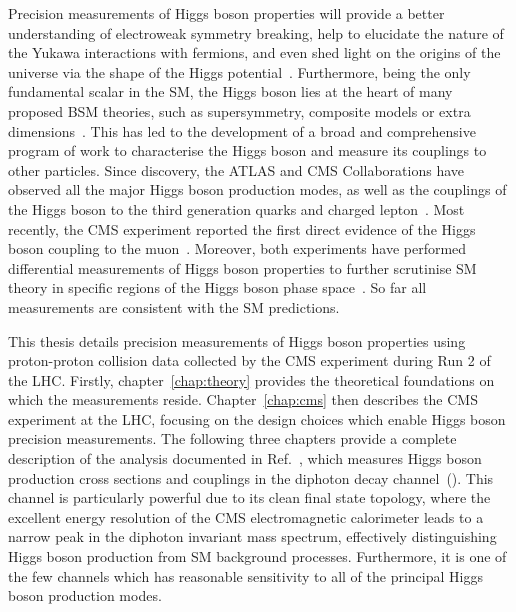 Precision measurements of Higgs boson properties will provide a better understanding of electroweak symmetry breaking, help to elucidate the nature of the Yukawa interactions with fermions, and even shed light on the origins of the universe via the shape of the Higgs potential~\cite{Kajantie:1995kf,Csikor:1998eu}. Furthermore, being the only fundamental scalar in the SM, the Higgs boson lies at the heart of many proposed BSM theories, such as supersymmetry, composite models or extra dimensions~\cite{Martin:1997ns,Witzel:2019jbe,Quiros:2013yaa}. This has led to the development of a broad and comprehensive program of work to characterise the Higgs boson and measure its couplings to other particles. Since discovery, the ATLAS and CMS Collaborations have observed all the major Higgs boson production modes, as well as the couplings of the Higgs boson to the third generation quarks and charged lepton~\cite{Aaboud:2018urx,Aaboud:2018zhk,Aaboud:2018pen,Sirunyan:2018hoz,Sirunyan:2018kst,Sirunyan:2017khh}. Most recently, the CMS experiment reported the first direct evidence of the Higgs boson coupling to the muon~\cite{Sirunyan:2020two}. Moreover, both experiments have performed differential measurements of Higgs boson properties to further scrutinise SM theory in specific regions of the Higgs boson phase space~\cite{ATLAS:2020wny,ATLAS-CONF-2019-029,Aad:2020jym,Sirunyan:2020hwz,Sirunyan:2020tzo}. So far all measurements are consistent with the SM predictions.

This thesis details precision measurements of Higgs boson properties using proton-proton collision data collected by the CMS experiment during Run 2 of the LHC. Firstly, chapter~\ref{chap:theory} provides the theoretical foundations on which the measurements reside. Chapter~\ref{chap:cms} then describes the CMS experiment at the LHC, focusing on the design choices which enable Higgs boson precision measurements. The following three chapters provide a complete description of the analysis documented in Ref.~\cite{Sirunyan:2021ybb}, which measures Higgs boson production cross sections and couplings in the diphoton decay channel~(\Hgg). This channel is particularly powerful due to its clean final state topology, where the excellent energy resolution of the CMS electromagnetic calorimeter leads to a narrow peak in the diphoton invariant mass spectrum, effectively distinguishing Higgs boson production from SM background processes. Furthermore, it is one of the few channels which has reasonable sensitivity to all of the principal Higgs boson production modes. 


